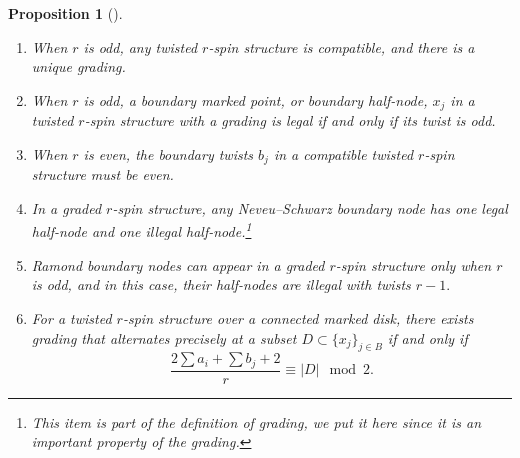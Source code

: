 \documentclass[11pt]{amsart}
\newtheorem{prop}[dummy]{Proposition}
\theoremstyle{definition}
\theoremstyle{remark}
\newcommand{\<}{\left<}
\renewcommand{\>}{\right>}
\numberwithin{equation}{section}
\begin{document}
\begin{prop}[{\cite[Proposition 2.3]{BCT2}}] 
\label{prop lifting}
\begin{enumerate}
\item\label{it lift odd exist} When %
$r$ is odd, any twisted $r$-spin structure is compatible, and there is a unique %
grading.
\item\label{it lift odd legal} When %
$r$ is odd, a boundary marked point, or boundary half-node, $x_j$ in a twisted $r$-spin structure with a grading is legal if and only if its twist is %
odd.
\item\label{it lift even compatible} When %
$r$ is even, the boundary twists $b_j$ in a compatible twisted $r$-spin structure must be %
even.  

\item\label{it NS nodes}
In %
a graded $r$-spin structure, any Neveu--Schwarz boundary node has one legal half-node and one %
illegal half-node.\footnote{This item is part of the definition of grading, we put it here since it is an important property of the grading.}

\item\label{it Ramond boundary node}
Ramond %
boundary nodes can appear in a graded $r$-spin structure only when $r$ is odd, and in %
this case, their %
half-nodes are illegal with twists %
$r-1.$

\item\label{it lift compatible parity}
For %
a twisted $r$-spin structure over a connected marked disk, there exists grading that alternates precisely at a subset $D \subset \{x_j\}_{j \in B}$ if and only %
if
\begin{equation}\label{eq parity}
   \frac{2\sum a_i + \sum b_j+ 2}{r}\equiv |D| \mod 2.
\end{equation}


\end{enumerate}
\end{prop}
\end{document}
